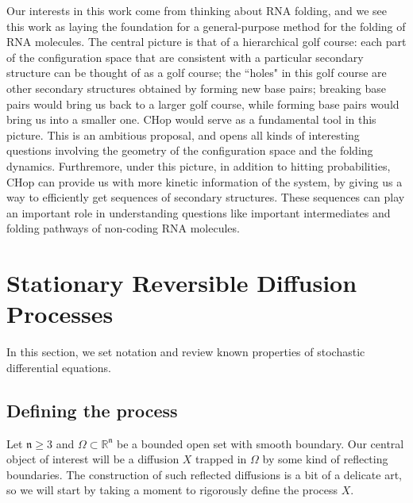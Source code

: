 \documentclass[english, aip, jcp, priprint, graphicx,floatfix]{revtex4-1}
\theoremstyle{plain}
\theoremstyle{definition}
\theoremstyle{plain}
\newcommand{\dimension}{{\mathfrak{n}}}
\begin{document}
Our interests in this work come from thinking about RNA folding, and we see this work as laying the foundation for a general-purpose method for the folding of RNA molecules. The central picture is that of a hierarchical golf course: each part of the configuration space that are consistent with a particular secondary structure can be thought of as a golf course; the ``holes" in this golf course are other secondary structures obtained by forming new base pairs; breaking base pairs would bring us back to a larger golf course, while forming base pairs would bring us into a smaller one. CHop would serve as a fundamental tool in this picture. This is an ambitious proposal, and opens all kinds of interesting questions involving the geometry of the configuration space and the folding dynamics. Furthremore, under this picture, in addition to hitting probabilities, CHop can provide us with more kinetic information of the system, by giving us a way to efficiently get sequences of secondary structures. These sequences can play an important role in understanding questions like important intermediates and folding pathways of non-coding RNA molecules.

\newpage

\appendix

                                                         


\section{Stationary Reversible Diffusion Processes}\label{sec:reversible_diffusion}

In this section, we set notation and review known properties of stochastic differential equations.   

\subsection{Defining the process}

Let $\dimension \geq 3$ and $\Omega \subset \mathbb{R}^\dimension$ be a bounded open set with smooth boundary.  Our central object of interest will be a diffusion $X$ trapped in $\Omega$ by some kind of reflecting boundaries.  The construction of such reflected diffusions is a bit of a delicate art, so we will start by taking a moment to rigorously define the process $X$.
\end{document}
